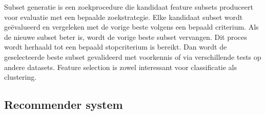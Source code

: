 Subset generatie is een zoekprocedure die kandidaat feature subsets produceert voor evaluatie met een bepaalde zoekstrategie. Elke kandidaat subset wordt ge\"evalueerd en vergeleken met de vorige beste volgens een bepaald criterium. Als de nieuwe subset beter is, wordt de vorige beste subset vervangen. Dit proces wordt herhaald tot een bepaald stopcriterium is bereikt. Dan wordt de geselecteerde beste subset gevalideerd met voorkennis of via verschillende tests op andere datasets. Feature selection is zowel interessant voor classificatie als clustering. 

\subsection{Recommender system}
